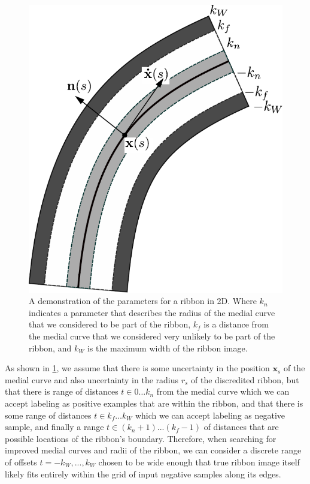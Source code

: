 \begin{figure}
    \centering
    \includegraphics[width=\textwidth]{Figures/sw-figure.pdf}
    \caption[2D Ribbon Image]{A demonstration of the parameters for a ribbon in 2D. Where $k_n$ indicates a parameter that describes the radius of the medial curve that we considered to be part of the ribbon, $k_f$ is a distance from the medial curve that we considered very unlikely to be part of the ribbon, and $k_W$ is the maximum width of the ribbon image.}
    \label{fig:2d_ribbon}
\end{figure}

As shown in \ref{fig:2d_ribbon}, we assume that there is some uncertainty in the position $\mathbf{x}_s$ of the medial curve and also uncertainty in the radius $r_s$ of the discredited ribbon, but that there is range of distances $t \in 0\dots k_n$ from the medial curve which we can accept labeling as positive examples that are within the ribbon, and that there is some range of distances $t \in k_f\dots k_W$ which we can accept labeling as negative sample, and finally a range $t\in (k_n+1)...(k_f-1)$ of distances that are possible locations of the ribbon's boundary.  Therefore, when searching for improved medial curves and radii of the ribbon, we can consider a discrete range of offsets $t=-k_W,..., k_W$ chosen to be wide enough that true ribbon image itself likely fits entirely within the grid of input negative samples along its edges.  

